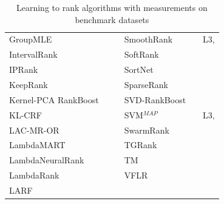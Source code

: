 \documentclass{sig-alternate-2013}
\begin{document}
\begin{table}[!hp]
\begin{tabular}{lll|lll}
GroupMLE & \cite{Lin2010} & \cite{Lin2011} & SmoothRank & \cite{Chapelle2010} & L3, \cite{Chapelle2010} \\
IntervalRank & \cite{Moon2010} & \cite{Moon2010, Freno2011} & SoftRank & \cite{Taylor2008, Guiver2008} & \cite{Qin2010b} \\ 
IPRank & \cite{Wang2009b} & \cite{Wang2009b, Torkestani2012} & SortNet & \cite{Rigutini2008} & \cite{Rigutini2008,Freno2011} \\
KeepRank & \cite{Chen2009} & \cite{Chen2009} & SparseRank & \cite{Lai2013b} & \cite{Lai2013b} \\ 
Kernel-PCA RankBoost & \cite{Duh2008} & \cite{Duh2008, Sato2013} & SVD-RankBoost & \cite{Lin2009} & \cite{Lin2009} \\
KL-CRF & \cite{Volkovs2011} & \cite{Volkovs2011} & SVM$^{MAP}$ & \cite{Yue2007} & L3, \cite{Wang2012, Xu2008, Niu2012} \\ 
LAC-MR-OR & \cite{Veloso2008} & \cite{Veloso2008} & SwarmRank & \cite{Diaz-Aviles2009} & \cite{Sato2013} \\ 
LambdaMART & \cite{Burges2010} & \cite{Asadi2013a, Ganjisaffar2011c} & TGRank & \cite{Lai2013} & \cite{Lai2013} \\ 
LambdaNeuralRank & \cite{Papini2012} & \cite{Papini2012} & TM & \cite{Zhou2008} & \cite{Zhou2008, Papini2012, Tan2013} \\ 
LambdaRank & \cite{Burges2006} &  & VFLR & \cite{Cai2012} & \cite{Cai2012} \\ 
LARF & \cite{Torkestani2012} & \cite{Torkestani2012} &  &  &  \\
\bottomrule
\end{tabular}
\caption{Learning to rank algorithms with measurements on benchmark datasets}
\label{tab:ltr_methods_used}
\end{table}

\clearpage
\end{document}
